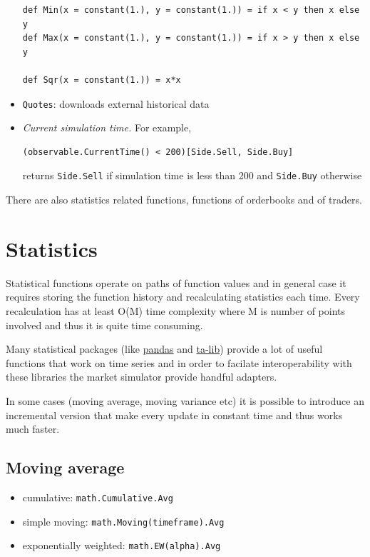 \documentclass[a4paper,11pt]{article}
\begin{document}
\begin{itemize}
\begin{verbatim}
def Min(x = constant(1.), y = constant(1.)) = if x < y then x else y
def Max(x = constant(1.), y = constant(1.)) = if x > y then x else y

def Sqr(x = constant(1.)) = x*x
\end{verbatim}

\item
  \texttt{Quotes}: downloads external historical data
  
\item \emph{Current simulation time.}
For example,

\begin{verbatim}
(observable.CurrentTime() < 200)[Side.Sell, Side.Buy]
\end{verbatim}

returns \texttt{Side.Sell} if simulation time is less than 200 and
\texttt{Side.Buy} otherwise
\end{itemize}

There are also statistics related functions,
functions of orderbooks and of traders.

\section{Statistics}\label{statistics}

Statistical functions operate on paths of function values and in general
case it requires storing the function history and recalculating
statistics each time. Every recalculation has at least O(M) time
complexity where M is number of points involved and thus it is quite
time consuming.

Many statistical packages (like \href{http://pandas.pydata.org/}{pandas}
and \href{http://ta-lib.org/}{ta-lib}) provide a lot of useful functions
that work on time series and in order to facilate interoperability with
these libraries the market simulator provide handful adapters.

In some cases (moving average, moving variance etc) it is possible to
introduce an incremental version that make every update in constant time
and thus works much faster.

\subsection{Moving average}\label{moving-average}

\begin{itemize}
\itemsep1pt\parskip0pt
\item
  cumulative: \texttt{math.Cumulative.Avg}
\item
  simple moving: \texttt{math.Moving(timeframe).Avg}
\item
  exponentially weighted: \texttt{math.EW(alpha).Avg}
\end{itemize}
\end{document}
